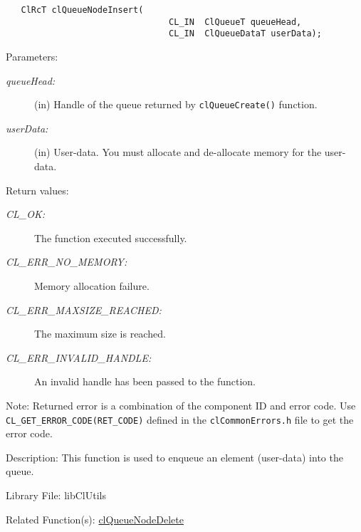 \begin{flushleft}
\begin{Desc}
\footnotesize\begin{verbatim}   ClRcT clQueueNodeInsert(
                       			CL_IN  ClQueueT queueHead,
                       			CL_IN  ClQueueDataT userData);
\end{verbatim}
\normalsize
\end{Desc}
\begin{Desc}
\item[Parameters:]
\begin{description}
\item[{\em queue\-Head:}](in) Handle of the queue returned by {\tt{cl\-Queue\-Create()}} function. \item[{\em user\-Data:}](in) User-data. You must 
allocate 
and de-allocate memory for the user-data.\end{description}
\end{Desc}
\begin{Desc}
\item[Return values:]
\begin{description}
\item[{\em CL\_\-OK:}]The function executed successfully. 
\item[{\em CL\_\-ERR\_\-NO\_\-MEMORY:}]Memory allocation failure. 
\item[{\em CL\_\-ERR\_\-MAXSIZE\_\-REACHED:}]The maximum size is reached. 
\item[{\em CL\_\-ERR\_\-INVALID\_\-HANDLE:}]An invalid handle has been passed to the function.\end{description}
\end{Desc}
\begin{Desc}
\item[Note:]Returned error is a combination of the component ID and error code. Use 
{\tt {CL\_\-GET\_\-ERROR\_\-CODE(RET\_\-CODE)}} defined in the {\tt{clCommonErrors.h}} file to get the error code.\end{Desc}
\begin{Desc}
\item[Description:]This function is used to enqueue an element (user-data) into the queue.\end{Desc}
\begin{Desc}
\item[Library File:]lib\-Cl\-Utils\end{Desc}
\begin{Desc}
\item[Related Function(s):]\hyperlink{pageq103}{cl\-Queue\-Node\-Delete} \end{Desc}
\newpage



\end{flushleft}
